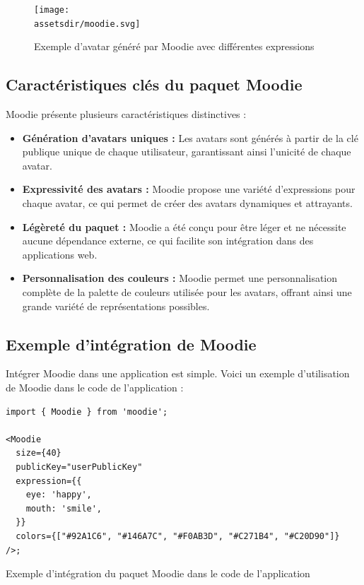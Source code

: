 \begin{figure}[H]
    \centering
    \texttt{[image: \\assetsdir/moodie.svg]}
    \caption{Exemple d'avatar généré par Moodie avec différentes expressions}
\end{figure}

\subsection{Caractéristiques clés du paquet Moodie}

Moodie présente plusieurs caractéristiques distinctives :

\begin{itemize}
    \item \textbf{Génération d'avatars uniques :} Les avatars sont générés à partir de la clé publique unique de chaque utilisateur, garantissant ainsi l'unicité de chaque avatar.
    \item \textbf{Expressivité des avatars :} Moodie propose une variété d'expressions pour chaque avatar, ce qui permet de créer des avatars dynamiques et attrayants.
    \item \textbf{Légèreté du paquet :} Moodie a été conçu pour être léger et ne nécessite aucune dépendance externe, ce qui facilite son intégration dans des applications web.
    \item \textbf{Personnalisation des couleurs :} Moodie permet une personnalisation complète de la palette de couleurs utilisée pour les avatars, offrant ainsi une grande variété de représentations possibles.
\end{itemize}

\subsection{Exemple d'intégration de Moodie}

Intégrer Moodie dans une application est simple. Voici un exemple d'utilisation de Moodie dans le code de l'application :

\begin{listing}[H]
    \begin{verbatim}
import { Moodie } from 'moodie';

<Moodie
  size={40}
  publicKey="userPublicKey"
  expression={{
    eye: 'happy',
    mouth: 'smile',
  }}
  colors={["#92A1C6", "#146A7C", "#F0AB3D", "#C271B4", "#C20D90"]}
/>;
  \end{verbatim}
    \caption{Exemple d'intégration du paquet Moodie dans le code de l'application}
\end{listing}

